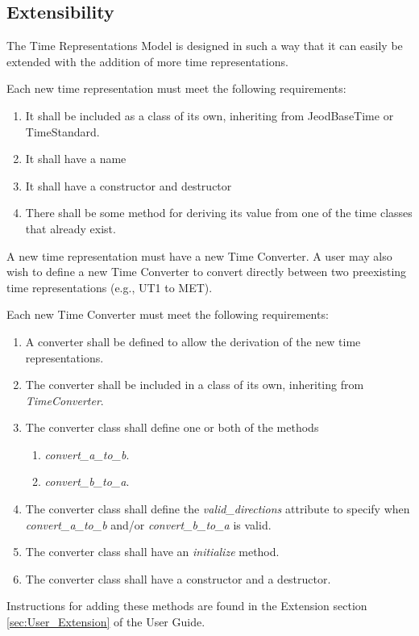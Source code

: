 \clearpage
\subsection{Extensibility}
The Time Representations Model is designed in such a way that it can
easily be extended with the addition of more time representations.

Each new time representation must meet the following requirements:


\begin{enumerate}
\item It shall be included as a class of its own, inheriting from JeodBaseTime
or TimeStandard.
\item It shall have a name
\item It shall have a constructor and destructor
\item There shall be some method for deriving its value from one of the
time classes that already exist.
\end{enumerate}



A new time representation must have a new Time Converter.  A user may
also wish to define a new Time Converter to convert directly between two
preexisting time representations (e.g., UT1 to MET).

Each new Time Converter must meet the following requirements:

\begin{enumerate}
	\item A converter shall be defined to allow the derivation of the new
	time representations.
	\item The converter shall be included in a class of its own, inheriting
	from \textit{TimeConverter}.
	\item The converter class shall define one or both of the methods
\begin{enumerate}
	\item \textit{convert\_a\_to\_b}.
  \item \textit{convert\_b\_to\_a}.
\end{enumerate}
  \item The converter class shall define the \textit{valid\_directions} attribute to specify when \textit{convert\_a\_to\_b} and/or \textit{convert\_b\_to\_a} is valid.
  \item The converter class shall have an \textit{initialize} method.
  \item The converter class shall have a constructor and a destructor.
\end{enumerate}

Instructions for adding these methods are found in the Extension section
\vref{sec:User_Extension} of the User Guide.
